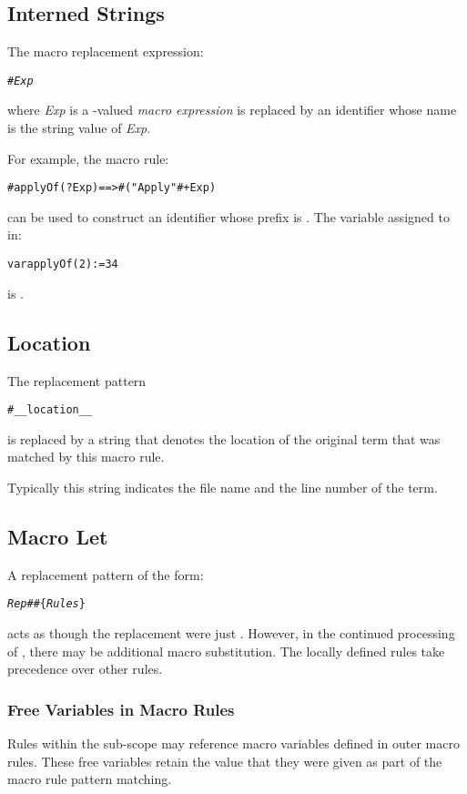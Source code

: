\subsection{Interned Strings}
The macro replacement expression:
\begin{alltt}
#\tlda \emph{Exp}
\end{alltt}
where \emph{Exp} is a -valued \emph{macro expression} is replaced by an identifier whose name is the string value of \emph{Exp}.

For example, the macro rule:
\begin{alltt}
#applyOf(?Exp) ==> #\tlda("Apply"#+Exp)
\end{alltt}
can be used to construct an identifier whose prefix is . The variable assigned to in:
\begin{alltt}
var applyOf(2) := 34
\end{alltt}
is .

\subsection{Location}
\label{locationMacro}

The replacement pattern 
\begin{alltt}
#__location__
\end{alltt}
is replaced by a string that denotes the location of the original term that was matched by this macro rule.

Typically this string indicates the file name and the line number of the term.

\subsection{Macro Let}
\label{ScopedMacros}
A replacement pattern of the form:
\begin{alltt}
\emph{Rep} ## \{ \emph{Rules} \}
\end{alltt}
acts as though the replacement were just . However, in the continued processing of , there may be additional macro substitution. The locally defined rules take precedence over other rules.

\subsubsection{Free Variables in Macro Rules}
Rules within the sub-scope may reference macro variables defined in outer macro rules. These free variables retain the value that they were given as part of the macro rule pattern matching.

